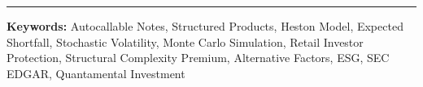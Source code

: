 \documentclass[12pt,a4paper]{article}
\begin{document}
\vfill
\noindent\rule{\textwidth}{0.4pt}
\vspace{0.3cm}
\noindent\textbf{Keywords:} Autocallable Notes, Structured Products, Heston Model, Expected Shortfall, Stochastic Volatility, Monte Carlo Simulation, Retail Investor Protection, Structural Complexity Premium, Alternative Factors, ESG, SEC EDGAR, Quantamental Investment
\end{document}
